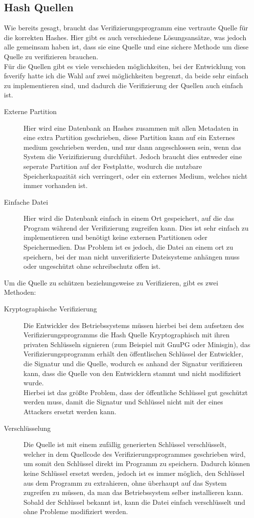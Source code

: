 \subsection{Hash Quellen}
Wie bereits gesagt, braucht das Verifizierungsprogramm eine vertraute Quelle für die korrekten Hashes.
Hier gibt es auch verschiedene Lösungsansätze, was jedoch alle gemeinsam haben ist, dass sie eine Quelle und eine sichere Methode um diese Quelle zu verifizieren brauchen.
\\
Für die Quellen gibt es viele verschieden möglichkeiten, bei der Entwicklung von fsverify hatte ich die Wahl auf zwei möglichkeiten begrenzt, da beide sehr einfach zu implementieren sind, und dadurch die Verifizierung der Quellen auch einfach ist.
\begin{description}
\item[Externe Partition]
  Hier wird eine Datenbank an Hashes zusammen mit allen Metadaten in eine extra Partition geschrieben, diese Partition kann auf ein Externes medium geschrieben werden, und nur dann angeschlossen sein, wenn das System die Verizifizierung durchführt.
  Jedoch braucht dies entweder eine seperate Partition auf der Festplatte, wodurch die nutzbare Speicherkapazität sich verringert, oder ein externes Medium, welches nicht immer vorhanden ist.
\item[Einfache Datei]
  Hier wird die Datenbank einfach in einem Ort gespeichert, auf die das Program während der Verifizierung zugreifen kann. Dies ist sehr einfach zu implementieren und benötigt keine externen Partitionen oder Speichermedien. Das Problem ist es jedoch, die Datei an einem ort zu speichern, bei der man nicht unverifizierte Dateisysteme anhängen muss oder ungeschützt ohne schreibschutz offen ist.
\end{description}
\pagebreak
Um die Quelle zu schützen beziehungsweise zu Verifizieren, gibt es zwei Methoden:
\begin{description}
\item[Kryptographische Verifizierung]
  Die Entwickler des Betriebssystems müssen hierbei bei dem aufsetzen des Verifizierungsprogramms die Hash Quelle Kryptographisch mit ihren privaten Schlüsseln signieren (zum Beispiel mit GnuPG oder Minisgin), das Verifizierungsprogramm erhält den öffentlischen Schlüssel der Entwickler, die Signatur und die Quelle, wodurch es anhand der Signatur verifizieren kann, dass die Quelle von den Entwicklern stammt und nicht modifiziert wurde.\\
  Hierbei ist das größte Problem, dass der öffentliche Schlüssel gut geschützt werden muss, damit die Signatur und Schlüssel nicht mit der eines Attackers ersetzt werden kann.
\item[Verschlüsselung]
  Die Quelle ist mit einem zufällig generierten Schlüssel verschlüsselt, welcher in dem Quellcode des Verifizierungsprogrammes geschrieben wird, um somit den Schlüssel direkt im Programm zu speichern. Dadurch können keine Schlüssel ersetzt werden, jedoch ist es immer möglich, den Schlüssel aus dem Programm zu extrahieren, ohne überhaupt auf das System zugreifen zu müssen, da man das Betriebssystem selber installieren kann. Sobald der Schlüssel bekannt ist, kann die Datei einfach verschlüsselt und ohne Probleme modifiziert werden.
\end{description}

